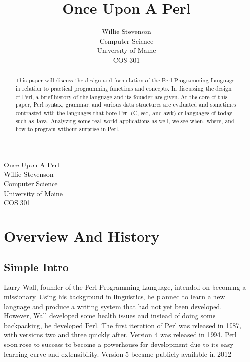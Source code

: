 \documentclass[11pt,a4paper]{article}
\begin{document}
\thispagestyle{empty}

\author{Willie Stevenson\\
Computer Science\\
University of Maine\\
COS 301\\}
\title{Once Upon A Perl}
\maketitle

\onehalfspacing

\newpage
\begin{abstract}
\noindent This paper will discuss the design and formulation of the Perl Programming Language in relation to practical programming functions and concepts. In discussing the design of Perl, a brief history of the language and its founder are given. At the core of this paper, Perl syntax, grammar, and various data structures are evaluated and sometimes contrasted with the languages that bore Perl (C, sed, and awk) or languages of today such as Java. Analyzing some real world applications as well, we see when, where, and how to program without surprise in Perl. 
\end{abstract}
\newpage
\tableofcontents
\newpage
\listoffigures
\newpage
{}
\begin{center}
{\LARGE Once Upon A Perl}\\
Willie Stevenson\\
Computer Science\\
University of Maine\\
COS 301
\end{center}
\section{Overview And History}
\subsection{Simple Intro}
Larry Wall, founder of the Perl Programming Language, intended on becoming a missionary\cite{01}. Using his background in linguistics, he planned to learn a new language and produce a writing system that had not yet been developed. However, Wall developed some health issues and instead of doing some backpacking, he developed Perl. The first iteration of Perl was released in 1987, with versions two and three quickly after. Version 4 was released in 1994. Perl soon rose to success to become a powerhouse for development due to its easy learning curve and extensibility.  Version 5 became publicly available in 2012. \\
\end{document}
